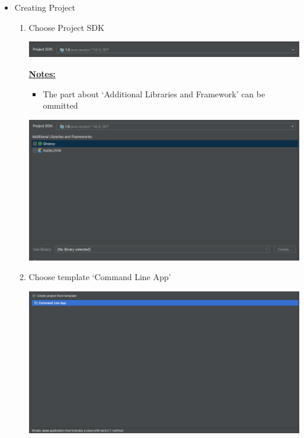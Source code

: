 \documentclass[12pt]{article}
\begin{document}
\begin{itemize}

    \item Creating Project
    \begin{enumerate}[1.]
        \item Choose Project SDK


        \begin{center}
        \includegraphics[width=\linewidth]{images/part_2_notes_1.png}
        \end{center}

        \bigskip

        \underline{\textbf{Notes:}}

        \bigskip

        \begin{itemize}
            \item The part about `Additional Libraries and Framework' can be ommitted
        \end{itemize}

        \begin{center}
        \includegraphics[width=\linewidth]{images/part_2_notes_2.png}
        \end{center}

        \item Choose template `Command Line App'

        \begin{center}
        \includegraphics[width=\linewidth]{images/part_2_notes_3.png}
        \end{center}


\end{enumerate}
\end{itemize}
\end{document}
